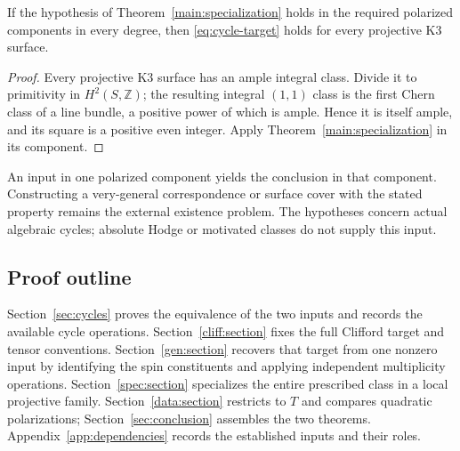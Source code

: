 \begin{corollary}\label{main:all-degrees}
If the hypothesis of Theorem~\ref{main:specialization} holds in the required polarized components in every degree, then \eqref{eq:cycle-target} holds for every projective K3 surface.
\end{corollary}

\begin{proof}
Every projective K3 surface has an ample integral class. Divide it to primitivity in $H^2(S,\mathbb Z)$; the resulting integral $(1,1)$ class is the first Chern class of a line bundle, a positive power of which is ample. Hence it is itself ample, and its square is a positive even integer. Apply Theorem~\ref{main:specialization} in its component.
\end{proof}

An input in one polarized component yields the conclusion in that component. Constructing a very-general correspondence or surface cover with the stated property remains the external existence problem. The hypotheses concern actual algebraic cycles; absolute Hodge or motivated classes do not supply this input.

\subsection{Proof outline}

Section~\ref{sec:cycles} proves the equivalence of the two inputs and records the available cycle operations. Section~\ref{cliff:section} fixes the full Clifford target and tensor conventions. Section~\ref{gen:section} recovers that target from one nonzero input by identifying the spin constituents and applying independent multiplicity operations. Section~\ref{spec:section} specializes the entire prescribed class in a local projective family. Section~\ref{data:section} restricts to $T$ and compares quadratic polarizations; Section~\ref{sec:conclusion} assembles the two theorems. Appendix~\ref{app:dependencies} records the established inputs and their roles.
